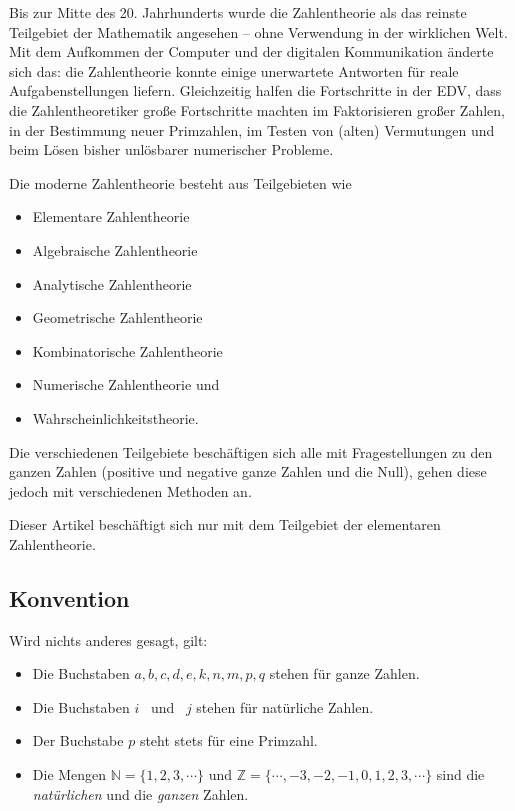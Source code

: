 \begin{refsegment}
Bis zur Mitte des 20. Jahrhunderts wurde die Zahlentheorie als das reinste
Teilgebiet der Mathematik angesehen -- ohne Verwendung in der wirklichen Welt.
Mit dem Aufkommen der Computer und der digitalen Kommunikation änderte sich
das: die Zahlentheorie konnte einige unerwartete Antworten für reale
Aufgabenstellungen liefern. Gleichzeitig halfen die Fortschritte in der EDV,
dass die Zahlentheoretiker große Fortschritte machten im Faktorisieren großer
Zahlen, in der Bestimmung neuer Primzahlen, im Testen von (alten)
Vermutungen und beim Lösen bisher unlösbarer numerischer Probleme.

Die moderne Zahlentheorie  besteht aus Teilgebieten wie
\begin{itemize}
    \item Elementare Zahlentheorie
    \item Algebraische Zahlentheorie
    \item Analytische Zahlentheorie
    \item Geometrische Zahlentheorie
    \item Kombinatorische Zahlentheorie
    \item Numerische Zahlentheorie und
    \item Wahrscheinlichkeitstheorie.
\end{itemize}

Die verschiedenen Teilgebiete beschäftigen sich alle mit Fragestellungen zu
den ganzen Zahlen (positive und negative ganze Zahlen und die Null), gehen
diese jedoch mit verschiedenen Methoden an.

Dieser Artikel beschäftigt sich nur mit dem Teilgebiet der elementaren
Zahlentheorie.


\subsection{Konvention}
Wird nichts anderes gesagt, gilt:
\begin{itemize}
\item Die Buchstaben $a, b, c, d, e, k, n, m, p, q$ stehen für ganze Zahlen.
\item Die Buchstaben $i$ ~\mbox{und} ~$j$ stehen für natürliche Zahlen.
\item Der Buchstabe $p$ steht stets für eine Primzahl.
\item Die Mengen $\mathbb{N} = \{ 1, 2, 3, \cdots \}$ und $\mathbb{Z} =\{ \cdots, -3, -2, -1, 0, 1, 2, 3, \cdots \}$
sind die {\em natürlichen} und die {\em ganzen} Zahlen.
\end{itemize}




\end{refsegment}
